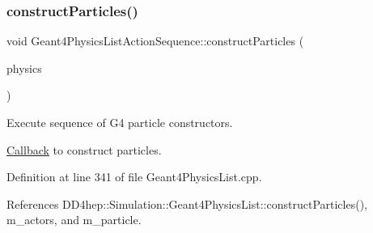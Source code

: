 \hypertarget{class_d_d4hep_1_1_simulation_1_1_geant4_physics_list_action_sequence_a4061788d8d84ae4bad79f7f8e53ec14b}{}\label{class_d_d4hep_1_1_simulation_1_1_geant4_physics_list_action_sequence_a4061788d8d84ae4bad79f7f8e53ec14b} 
\subsubsection{\texorpdfstring{construct\+Particles()}{constructParticles()}}
{\footnotesize\ttfamily void Geant4\+Physics\+List\+Action\+Sequence\+::construct\+Particles (\begin{DoxyParamCaption}\item[{G4\+V\+User\+Physics\+List $\ast$}]{physics }\end{DoxyParamCaption})\hspace{0.3cm}{\ttfamily [virtual]}}



Execute sequence of G4 particle constructors. 

\hyperlink{class_d_d4hep_1_1_callback}{Callback} to construct particles. 

Definition at line 341 of file Geant4\+Physics\+List.\+cpp.



References D\+D4hep\+::\+Simulation\+::\+Geant4\+Physics\+List\+::construct\+Particles(), m\+\_\+actors, and m\+\_\+particle.

\hypertarget{class_d_d4hep_1_1_simulation_1_1_geant4_physics_list_action_sequence_a14bd3491087a274666b7d87f148f869c}{}\label{class_d_d4hep_1_1_simulation_1_1_geant4_physics_list_action_sequence_a14bd3491087a274666b7d87f148f869c} 
